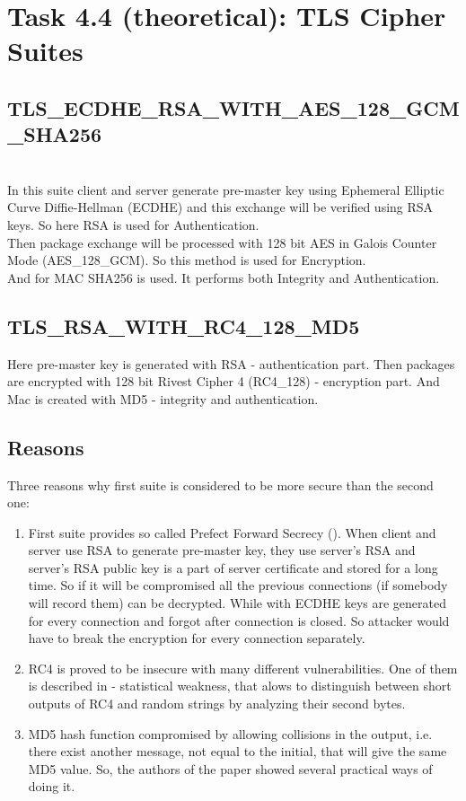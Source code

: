 \documentclass{article}
\begin{document}
\section*{Task 4.4 (theoretical): TLS Cipher Suites}
\subsection*{TLS\_ECDHE\_RSA\_WITH\_AES\_128\_GCM\_SHA256}
\cite{tls-ref}
\\
In this suite client and server generate pre-master key using Ephemeral Elliptic Curve Diffie-Hellman (ECDHE) and this exchange will be verified using RSA keys. So here RSA is used for Authentication. 
\\
Then package exchange will be processed with 128 bit AES in Galois Counter Mode (AES\_128\_GCM). So this method is used for Encryption.
\\
And for MAC SHA256 is used. It performs both Integrity and Authentication.

\subsection*{TLS\_RSA\_WITH\_RC4\_128\_MD5}
Here pre-master key is generated with RSA - authentication part. Then packages are encrypted with 128 bit Rivest Cipher 4 (RC4\_128) - encryption part. And Mac is created with MD5 - integrity and authentication.

\subsection*{Reasons}
Three reasons why first suite is considered to be more secure than the second one:
\begin{enumerate}
\item First suite provides so called Prefect Forward Secrecy (\cite{pfc}). When client and server use RSA to generate pre-master key, they use server's RSA and server's RSA public key is a part of server certificate and stored for a long time. So if it will be compromised all the previous connections (if somebody will record them) can be decrypted. While with ECDHE keys are generated for every connection and forgot after connection is closed. So attacker would have to break the encryption for every connection separately.
\item RC4 is proved to be insecure with many different vulnerabilities. One of them is described in \cite{rc4-vuln} - statistical weakness, that alows to distinguish between short outputs of RC4 and random strings by analyzing their second bytes. 
\item MD5 hash function compromised by allowing collisions in the output, i.e. there exist another message, not equal to the initial, that will give the same MD5 value. So, the authors of the paper \cite{md5-coll} showed several practical ways of doing it.
\end{enumerate}
\end{document}
